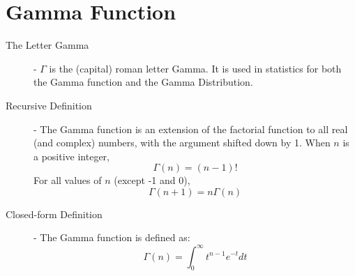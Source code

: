 \documentclass[11.5pt]{article}
\begin{document}
\begin{notes}
\begin{description}
\end{description}

\newpage

\section*{Gamma Function}
\begin{description}
\item[The Letter Gamma] - $\Gamma$ is the (capital) roman letter Gamma. It is used in statistics for both the Gamma function and the Gamma Distribution.
\item[Recursive Definition] - The Gamma function is an extension of the factorial function to all real (and complex) numbers, with the argument shifted down by 1. When $n$ is a positive integer, 
	\[\Gamma(n) = (n-1)!\]
For all values of $n$ (except -1 and 0),
	\[\Gamma(n + 1) = n\Gamma(n)\]
\item[Closed-form Definition] - The Gamma function is defined as:
	\[\Gamma(n) = \int_0^\infty t^{n-1}e^{-t}dt\]
\end{description}


\end{notes}
\end{document}
